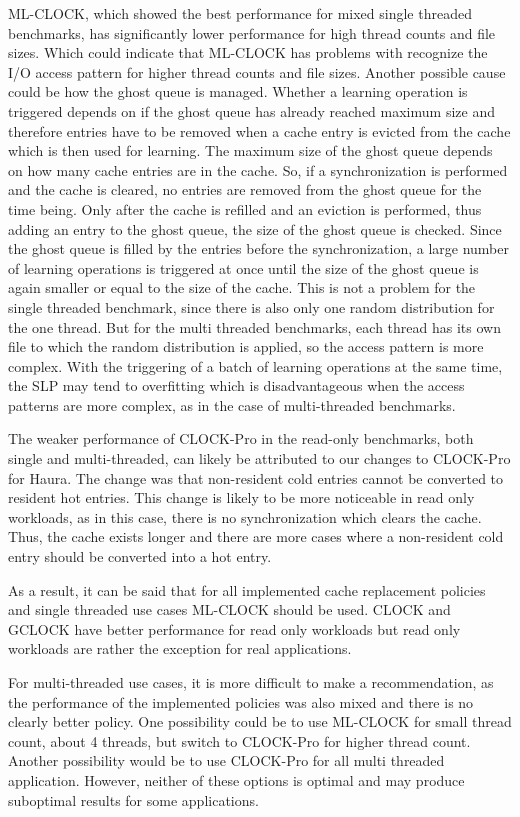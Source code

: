 \documentclass[
	12pt,
	a4paper,
	abstract,
	bibliography=totoc,
	chapterprefix,
	headings=openright,
	numbers=endperiod,
	parskip=half,
	twoside,
]{scrreprt}
\begin{document}
ML-CLOCK, which showed the best performance for mixed single threaded benchmarks, has 
significantly lower performance for high thread counts and file sizes.
Which could indicate that ML-CLOCK has problems with recognize the I/O access 
pattern for higher thread counts and file sizes.
Another possible cause could be how the ghost queue is managed.
Whether a learning operation is triggered depends on if the ghost queue has already reached maximum size and 
therefore entries have to be removed when a cache entry is evicted from the cache which is then used for learning.
The maximum size of the ghost queue depends on how many cache entries are in the cache.
So, if a synchronization is performed and the cache is cleared,
no entries are removed from the ghost queue for the time being.
Only after the cache is refilled and an eviction is performed, thus adding an entry to the ghost queue, 
the size of the ghost queue is checked.
Since the ghost queue is filled by the entries before the synchronization, a large number of learning operations 
is triggered at once until the size of the ghost queue is again smaller or equal to the size of the cache.
This is not a problem for the single threaded benchmark, since there is also only one random distribution for the one thread.
But for the multi threaded benchmarks, each thread has its own file to which the random 
distribution is applied, so the access pattern is more complex.
With the triggering of a batch of learning operations at the same time, the SLP may tend to overfitting 
which is disadvantageous when the access patterns are more complex, as in the case of multi-threaded benchmarks.

The weaker performance of CLOCK-Pro in the read-only benchmarks, both single and multi-threaded, 
can likely be attributed to our changes to CLOCK-Pro for Haura.
The change was that non-resident cold entries cannot be converted to resident hot entries.
This change is likely to be more noticeable in read only workloads, 
as in this case, there is no synchronization which clears the cache.
Thus, the cache exists longer and there are more cases where a non-resident cold entry 
should be converted into a hot entry.

As a result, it can be said that for all implemented cache replacement policies and 
single threaded use cases ML-CLOCK should be used.
CLOCK and GCLOCK have better performance for read only workloads but read only 
workloads are rather the exception for real applications.

For multi-threaded use cases, it is more difficult to make a recommendation, 
as the performance of the implemented policies was also mixed and there is no clearly better policy.
One possibility could be to use ML-CLOCK for small thread count, about 4 threads, but switch to CLOCK-Pro 
for higher thread count.
Another possibility would be to use CLOCK-Pro for all multi threaded application.
However, neither of these options is optimal and may produce suboptimal results for some applications.
\end{document}
